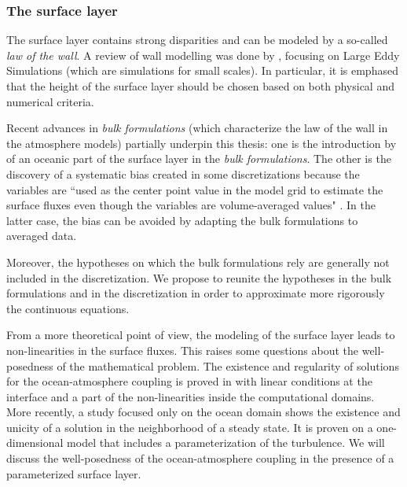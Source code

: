 \subsubsection*{The surface layer}
The surface layer contains strong disparities and can be modeled by a so-called
\textit{law of the wall}. A review of wall modelling was done by
\citep{larsson_large_2016}, focusing on Large Eddy Simulations
(which are simulations for small scales).
In particular, it is emphased that the height of the surface layer
should be chosen based on both physical and numerical criteria.
\par
Recent advances in \textit{bulk formulations}
(which characterize the law of the wall in the atmosphere models)
partially underpin this thesis:
one is the introduction by \citep{pelletier_two-sided_2021}
of an oceanic part of the surface layer in the \textit{bulk formulations}.
The other is the discovery of a systematic bias
created in some discretizations because the variables are
``used as the center point value in the model grid
to estimate the surface fluxes even though
the variables are volume-averaged values"
\citep{nishizawa_surface_2018}.
In the latter case, the bias can be avoided by
adapting the bulk formulations to averaged
data.
\par
Moreover, the hypotheses on which the bulk formulations rely
are generally not included in the discretization.
We propose to reunite the hypotheses in the bulk formulations
and in the discretization in order to
approximate more rigorously the continuous equations.
\par
From a more theoretical point of view,
the modeling of the surface layer leads to
non-linearities in the surface fluxes. This raises
some questions about the well-posedness of the mathematical
problem.
The existence and regularity of solutions for
the ocean-atmosphere coupling is proved
in \citep{lions_mathematical_1995} with linear conditions at
the interface and a part of the non-linearities
inside the computational domains.
More recently, a study focused only
on the ocean domain \citep{chacon-rebollo_existence_2014}
shows the existence and unicity of a solution in the neighborhood
of a steady state. It is proven on a one-dimensional model that
includes a parameterization of the turbulence.
We will discuss the well-posedness of the ocean-atmosphere coupling
in the presence of a parameterized surface layer.
%
